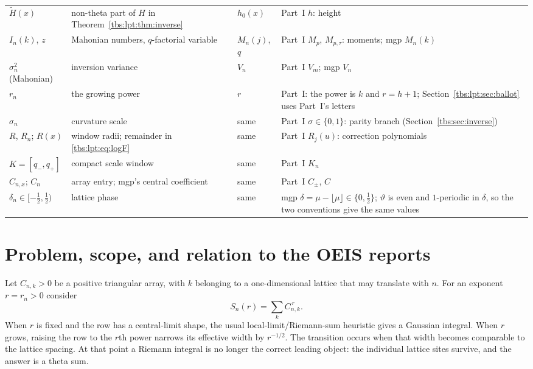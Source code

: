\documentclass[11pt,a4paper]{article}
\numberwithin{equation}{section}
\theoremstyle{definition}
\begin{document}
\begin{longtable}{@{}>{\raggedright}p{}>{\raggedright}p{}>{\raggedright}p{}p{}@{}}
$\tilde H(x)$ & non-theta part of $H$ in Theorem~\ref{tbs:lpt:thm:inverse} & $h_0(x)$ & Part~I $h$: height\\
$I_n(k)$, $z$ & Mahonian numbers, $q$-factorial variable & $M_n(j)$, $q$ & Part~I $M_p$, $M_{p,\tau}$: moments; mgp $M_n(k)$\\
$\sigma_n^2$ (Mahonian) & inversion variance & $V_n$ & Part~I $V_m$; mgp $V_n$\\
$r_n$ & the growing power & $r$ & Part~I: the power is $k$ and $r=h+1$; Section~\ref{tbs:lpt:sec:ballot} uses Part~I's letters\\
$\sigma_n$ & curvature scale & same & Part~I $\sigma\in\{0,1\}$: parity branch (Section~\ref{tbs:sec:inverse})\\
$R$, $R_n$; $R(x)$ & window radii; remainder in \eqref{tbs:lpt:eq:logF} & same & Part~I $R_j(u)$: correction polynomials\\
$K=[q_-,q_+]$ & compact scale window & same & Part~I $K_n$\\
$C_{n,x}$; $C_n$ & array entry; mgp's central coefficient & same & Part~I $C_\pm$, $C$\\
$\delta_n\in[-\frac12,\frac12)$ & lattice phase & same & mgp $\delta=\mu-\lfloor\mu\rfloor\in\{0,\frac12\}$; $\vartheta$ is even and $1$-periodic in $\delta$, so the two conventions give the same values\\
\bottomrule
\end{longtable}

\section{Problem, scope, and relation to the OEIS reports}\label{tbs:lpt:sec:problem}

Let $C_{n,k}>0$ be a positive triangular array, with $k$ belonging to a
one-dimensional lattice that may translate with $n$. For an exponent
$r=r_n>0$ consider
\begin{equation}\label{tbs:lpt:eq:power-sum}
 S_n(r)=\sum_k C_{n,k}^{\,r}.
\end{equation}
When $r$ is fixed and the row has a central-limit shape, the usual
local-limit/Riemann-sum heuristic gives a Gaussian integral. When $r$
grows, raising the row to the $r$th power narrows its effective width by
$r^{-1/2}$. The transition occurs when that width becomes comparable to
the lattice spacing. At that point a Riemann integral is no longer the
correct leading object: the individual lattice sites survive, and the
answer is a theta sum.
\end{document}
